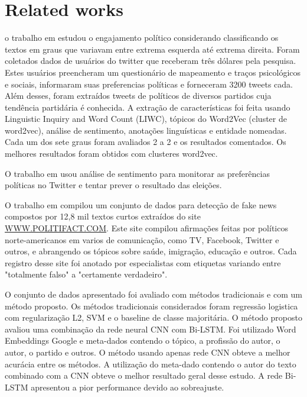 \documentclass{llncs}
\begin{document}
	
	\section{Related works}
	\label{sec.related}
	
	o trabalho em \cite{Preotiuc-Pietro2017} estudou o engajamento político considerando classificando os textos em graus que variavam entre extrema esquerda até extrema direita. Foram coletados dados de usuários do twitter que receberam três dólares pela pesquisa. Estes usuários preencheram um questionário de mapeamento e traços psicológicos e sociais, informaram suas preferencias políticas e forneceram 3200 tweets cada. Além desses, foram extraídos tweets de políticos de diversos partidos cuja tendência partidária é conhecida.
	A extração de características foi feita usando Linguistic Inquiry and Word Count (LIWC), tópicos do Word2Vec (cluster de word2vec), análise de sentimento, anotações linguísticas e entidade nomeadas. Cada um dos sete graus foram avaliados 2 a 2 e os resultados comentados. Os melhores resultados foram obtidos com clusteres word2vec.
	
	
	O trabalho em \cite{Bermingham2011} usou análise de sentimento para monitorar as preferências políticas no Twitter e tentar prever o resultado das eleições.
	
	O trabalho em \cite{Wang17} compilou um conjunto de dados para detecção de fake news compostos por 12,8 mil textos curtos extraídos do site  \url{WWW.POLITIFACT.COM}. Este site compilou afirmações feitas por políticos norte-americanos em varios de comunicação, como TV, Facebook, Twitter e outros, e abrangendo os tópicos sobre saúde, imigração, educação e outros. Cada registro desse site foi anotado por especialistas com etiquetas variando entre "totalmente falso" a "certamente verdadeiro".
	
	O conjunto de dados apresentado foi avaliado com métodos tradicionais e com um método proposto. Os métodos tradicionais considerados foram regressão logistica com regularização L2, SVM e o baseline de classe majoritária. O método proposto avaliou uma combinação da rede neural CNN com Bi-LSTM. Foi utilizado Word Embeddings Google  e meta-dados contendo o tópico, a profissão do autor, o autor, o partido e outros. O método usando apenas rede CNN obteve a melhor acurácia entre os métodos. A utilização do meta-dado contendo o autor do texto combinado com a CNN obteve o melhor resultado geral desse estudo. A rede Bi-LSTM apresentou a pior performance devido ao sobreajuste.
	
\end{document}
